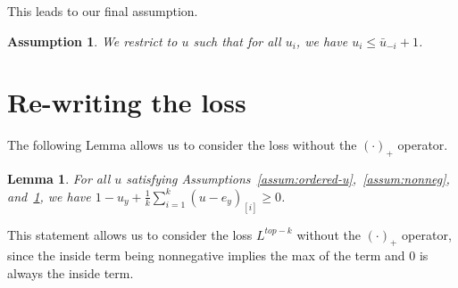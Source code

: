 \documentclass[12pt]{article}
\newtheorem{lemma}{Lemma}
\newtheorem{assumption}{Assumption}
\begin{document}
This leads to our final assumption.
\begin{assumption}\label{assum:top-threshold}
	We restrict to $u$ such that for all $u_i$, we have $u_i \leq \bar u_{-i} +1$.
\end{assumption}

\section{Re-writing the loss}
The following Lemma allows us to consider the loss without the $(\cdot)_+$ operator.

\begin{lemma}\label{lem:get-rid-max-op}
	For all $u$ satisfying Assumptions~\ref{assum:ordered-u},~\ref{assum:nonneg}, and~\ref{assum:top-threshold}, we have $1 -u_y + \frac{1}{k} \sum_{i=1}^k (u - e_y)_{[i]} \geq 0$.
\end{lemma}
This statement allows us to consider the loss $L^{top-k}$ without the $(\cdot)_+$ operator, since the inside term being nonnegative implies the max of the term and $0$ is always the inside term.
\end{document}
